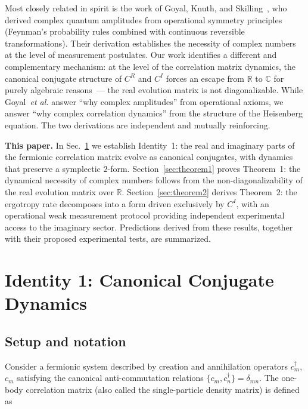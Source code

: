 \documentclass[aps,pra,preprint,groupedaddress,amsmath,amssymb,floatfix]{revtex4-2}
\begin{document}
Most closely related in spirit is the work of Goyal, Knuth, and Skilling~\cite{goyal2010}, who derived complex quantum amplitudes from operational symmetry principles (Feynman's probability rules combined with continuous reversible transformations). Their derivation establishes the necessity of complex numbers at the level of measurement postulates. Our work identifies a different and complementary mechanism: at the level of the correlation matrix dynamics, the canonical conjugate structure of $C^R$ and $C^I$ forces an escape from $\mathbb{R}$ to $\mathbb{C}$ for purely algebraic reasons~--- the real evolution matrix is not diagonalizable. While Goyal~\textit{et al.} answer ``why complex amplitudes'' from operational axioms, we answer ``why complex correlation dynamics'' from the structure of the Heisenberg equation. The two derivations are independent and mutually reinforcing.

\textbf{This paper.} In Sec.~\ref{sec:identity1} we establish Identity~1: the real and imaginary parts of the fermionic correlation matrix evolve as canonical conjugates, with dynamics that preserve a symplectic $2$-form. Section~\ref{sec:theorem1} proves Theorem~1: the dynamical necessity of complex numbers follows from the non-diagonalizability of the real evolution matrix over $\mathbb{R}$. Section~\ref{sec:theorem2} derives Theorem~2: the ergotropy rate decomposes into a form driven exclusively by $C^I$, with an operational weak measurement protocol providing independent experimental access to the imaginary sector. Predictions derived from these results, together with their proposed experimental tests, are summarized.

\section{Identity 1: Canonical Conjugate Dynamics}
\label{sec:identity1}

\subsection{Setup and notation}
\label{sec:setup}

Consider a fermionic system described by creation and annihilation operators $c^\dagger_m$, $c_m$ satisfying the canonical anti-commutation relations $\{c_m, c^\dagger_n\} = \delta_{mn}$. The one-body correlation matrix (also called the single-particle density matrix) is defined as
\end{document}
